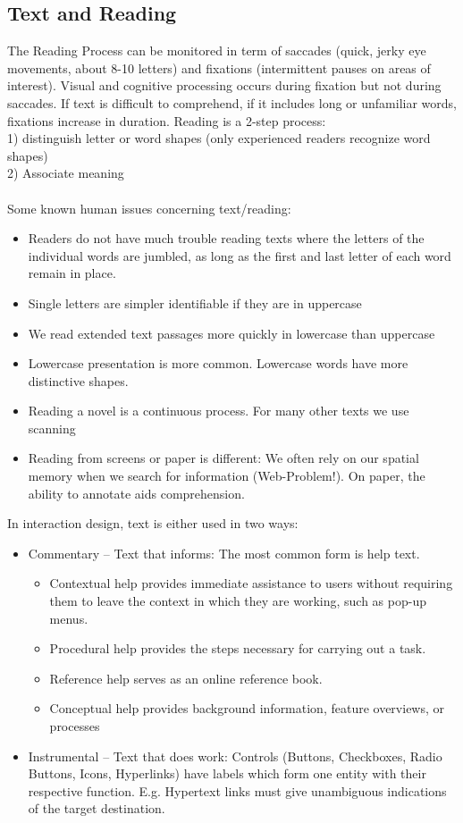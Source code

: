 \subsection{Text and Reading}
The Reading Process can be monitored in term of saccades (quick, jerky eye movements, about 8-10 letters) and fixations (intermittent pauses on areas of interest). Visual and cognitive processing occurs during fixation but not during saccades. If text is difficult to comprehend, if it includes long or unfamiliar words, fixations increase in duration. Reading is a 2-step process:\\
1) distinguish letter or word shapes (only experienced readers recognize word shapes)\\
2) Associate meaning\\\\
Some known human issues concerning text/reading:
\begin{itemize}
\item Readers do not have much trouble reading texts where the letters of the individual words are jumbled, as long as the first and last letter of each word remain in place.
\item Single letters are simpler identifiable if they are in uppercase
\item We read extended text passages more quickly in lowercase than uppercase
\item Lowercase presentation is more common. Lowercase words have more distinctive shapes.
\item Reading a novel is a continuous process. For many other texts we use scanning
\item Reading from screens or paper is different: We often rely on our spatial memory when we search for information (Web-Problem!). On paper, the ability to annotate aids comprehension.
\end{itemize}
In interaction design, text is either used in two ways:
\begin{itemize}
\item Commentary -- Text that informs: The most common form is help text.
\begin{itemize}
\item Contextual help provides immediate assistance to users without requiring them to leave the context in which they are working, such as pop-up menus.
\item Procedural help provides the steps necessary for carrying out a task.
\item Reference help serves as an online reference book.
\item Conceptual help provides background information, feature overviews, or processes
\end{itemize} 
\item Instrumental -- Text that does work: Controls (Buttons, Checkboxes, Radio Buttons, Icons, Hyperlinks) have labels which form one entity with their respective function. E.g. Hypertext links must give unambiguous indications of the target destination.
\end{itemize}
